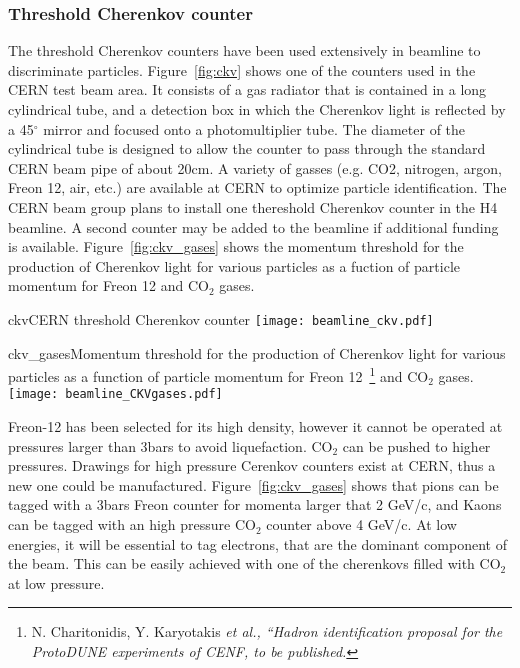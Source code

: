 \subsubsection{Threshold Cherenkov counter}
The threshold Cherenkov counters have been used extensively in beamline to discriminate particles. Figure~\ref{fig:ckv} shows one of the counters used in the CERN test beam area. It consists of a gas radiator that is contained in a long cylindrical tube, and a detection box in which the Cherenkov light is reflected by a 45$^\circ$ mirror and focused onto a photomultiplier tube. The diameter of the cylindrical tube is designed to allow the counter to pass through the standard CERN beam pipe of about 20cm. A variety of gasses (e.g. CO2, nitrogen, argon, Freon 12, air, etc.) are available at CERN to optimize particle identification. The CERN beam group plans to install one thereshold Cherenkov counter in the H4 beamline. A second counter may be added to the beamline if additional funding is available. Figure~\ref{fig:ckv_gases} shows the momentum threshold for the production of Cherenkov light for various particles as a fuction of particle momentum for Freon 12 and CO$_2$ gases.
\begin{cdrfigure}{ckv}{CERN threshold Cherenkov counter}
  \texttt{[image: beamline\_ckv.pdf]}
\end{cdrfigure}
\begin{cdrfigure}{ckv_gases}{Momentum threshold for the production of Cherenkov light for various particles as a function of particle momentum for Freon 12~\footnote{N. Charitonidis, Y. Karyotakis \it{et al.}, ``Hadron identification proposal for the ProtoDUNE experiments of CENF, to be published.} and CO$_2$ gases.}
  \texttt{[image: beamline\_CKVgases.pdf]}
\end{cdrfigure}
Freon-12 has been selected for its high density, however it cannot be operated at pressures larger than 3bars to avoid liquefaction.  CO$_2$ can be pushed to higher pressures.  Drawings for high pressure Cerenkov counters exist at CERN, thus a new one could be manufactured. 
 Figure~\ref{fig:ckv_gases} shows that pions can be tagged with a 3bars Freon counter for momenta larger that 2 GeV/c, and Kaons can be tagged with an high pressure  CO$_2$  counter above 4 GeV/c. 
At low energies, it will be essential  to tag electrons, that are the dominant component of the beam. This can be easily achieved with one   of the cherenkovs filled with CO$_2$ at low pressure.

